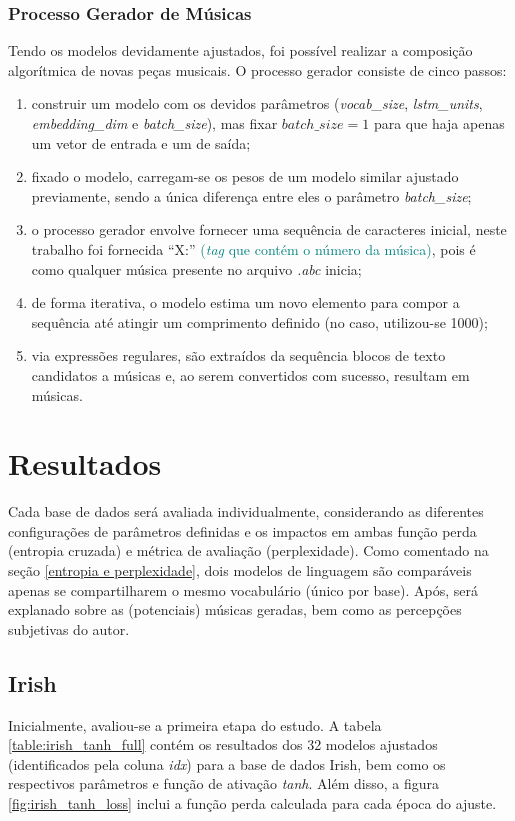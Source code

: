 \documentclass[twoside]{automatextcc}
\newcommand{\nico}[1]{\textcolor{teal}{#1}}
\begin{document}
\subsection{Processo Gerador de Músicas}
Tendo os modelos devidamente ajustados, foi possível realizar a composição algorítmica de novas peças musicais. O processo gerador consiste de cinco passos:
\begin{enumerate}
    \item construir um modelo com os devidos parâmetros (\textit{vocab\_size}, \textit{lstm\_units}, \textit{embedding\_dim} e \textit{batch\_size}), mas fixar $batch\_size=1$ para que haja apenas um vetor de entrada e um de saída; 
    \item fixado o modelo, carregam-se os pesos de um modelo similar ajustado previamente, sendo a única diferença entre eles o parâmetro \textit{batch\_size};
    \item o processo gerador envolve fornecer uma sequência de caracteres inicial, neste trabalho foi fornecida ``X:'' \nico{(\textit{tag} que contém o número da música)}, pois é como qualquer música presente no arquivo \textit{.abc} inicia;
    \item de forma iterativa, o modelo estima um novo elemento para compor a sequência até atingir um comprimento definido (no caso, utilizou-se 1000);
    \item via expressões regulares, são extraídos da sequência blocos de texto candidatos a músicas e, ao serem convertidos com sucesso, resultam em músicas.
\end{enumerate}




\chapter{Resultados}
Cada base de dados será avaliada individualmente, considerando as diferentes configurações de parâmetros definidas e os impactos em ambas função perda (entropia cruzada) e métrica de avaliação (perplexidade). Como comentado na seção \ref{entropia e perplexidade}, dois modelos de linguagem são comparáveis apenas se compartilharem o mesmo vocabulário (único por base). Após, será explanado sobre as (potenciais) músicas geradas, bem como as percepções subjetivas do autor. 



\section{Irish}
Inicialmente, avaliou-se a primeira etapa do estudo. A tabela \ref{table:irish_tanh_full} contém os resultados dos 32 modelos ajustados (identificados pela coluna \textit{idx}) para a base de dados Irish, bem como os respectivos parâmetros e função de ativação \textit{tanh}. Além disso, a figura \ref{fig:irish_tanh_loss} inclui a função perda calculada para cada época do ajuste. 
\end{document}
